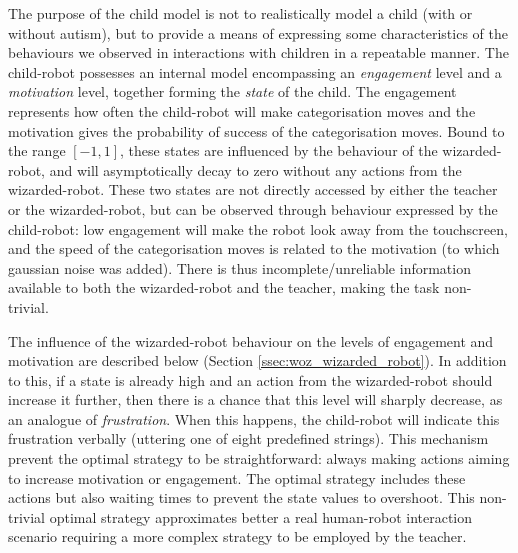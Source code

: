 The purpose of the child model is not to realistically model a child (with or without autism), but to provide a means of expressing some characteristics of the behaviours we observed in interactions with children in a repeatable manner. The child-robot possesses an internal model encompassing an \emph{engagement} level and a \emph{motivation} level, together forming the \textit{state} of the child. The engagement represents how often the child-robot will make categorisation moves and the motivation gives the probability of success of the categorisation moves. Bound to the range $[-1, 1]$, these states are influenced by the behaviour of the wizarded-robot, and will asymptotically decay to zero without any actions from the wizarded-robot. These two states are not directly accessed by either the teacher or the wizarded-robot, but can be observed through behaviour expressed by the child-robot: low engagement will make the robot look away from the touchscreen, and the speed of the categorisation moves is related to the motivation (to which gaussian noise was added). There is thus incomplete/unreliable information available to both the wizarded-robot and the teacher, making the task non-trivial.

The influence of the wizarded-robot behaviour on the levels of engagement and motivation are described below (Section \ref{ssec:woz_wizarded_robot}). In addition to this, if a state is already high and an action from the wizarded-robot should increase it further, then there is a chance that this level will sharply decrease, as an analogue of \textit{frustration}. When this happens, the child-robot will indicate this frustration verbally (uttering one of eight predefined strings). This mechanism prevent the optimal strategy to be straightforward: always making actions aiming to increase motivation or engagement. The optimal strategy includes these actions but also waiting times to prevent the state values to overshoot. This non-trivial optimal strategy approximates better a real human-robot interaction scenario requiring a more complex strategy to be employed by the teacher.

